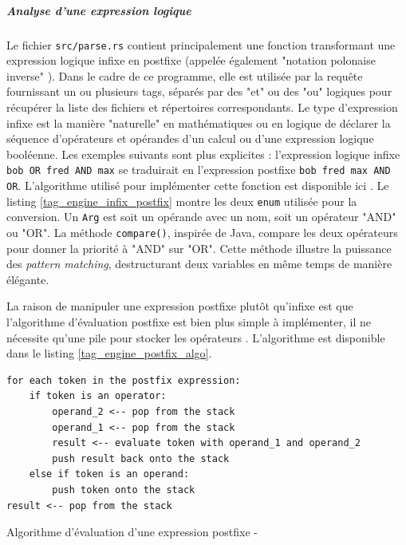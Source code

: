 \subparagraph{Analyse d'une expression logique}\label{tag_engine_parse}
Le fichier \texttt{src/parse.rs} contient principalement une fonction transformant 
une expression logique infixe en postfixe (appelée également "notation polonaise inverse" \cite{ref41}). 
Dans le cadre de ce programme, elle est utilisée par la requête fournissant un ou plusieurs tags, 
séparés par des "et" ou des "ou" logiques pour récupérer la liste des fichiers et répertoires 
correspondants. Le type d'expression infixe est la manière "naturelle" en mathématiques ou en 
logique de déclarer la séquence d'opérateurs et opérandes d'un calcul ou d'une expression logique 
booléenne. Les exemples suivants sont plus explicites : l'expression logique infixe 
\texttt{bob OR fred AND max} se traduirait en l'expression postfixe 
\texttt{bob fred max AND OR}. L'algorithme utilisé pour implémenter cette fonction 
est disponible ici \cite{ref40}. Le listing \ref{tag_engine_infix_postfix} montre 
les deux \texttt{enum} utilisée pour la conversion. Un \texttt{Arg} est soit 
un opérande avec un nom, soit un opérateur "AND" ou "OR". La méthode \texttt{compare()}, 
inspirée de Java, compare les deux opérateurs pour donner la priorité à "AND" sur "OR". Cette 
méthode illustre la puissance des \textit{pattern matching}, destructurant deux variables en 
même temps de manière élégante.
\bigbreak
{}
\bigbreak
La raison de manipuler une expression postfixe 
plutôt qu'infixe est que l'algorithme d'évaluation postfixe est bien plus simple à implémenter, il 
ne nécessite qu'une pile pour stocker les opérateurs \cite{ref41}. L'algorithme est disponible dans 
le listing \ref{tag_engine_postfix_algo}.
\bigbreak
\begin{code}
    \begin{verbatim}
for each token in the postfix expression:
    if token is an operator:
        operand_2 <-- pop from the stack
        operand_1 <-- pop from the stack
        result <-- evaluate token with operand_1 and operand_2
        push result back onto the stack
    else if token is an operand:
        push token onto the stack
result <-- pop from the stack
    \end{verbatim}
    \caption{Algorithme d'évaluation d'une expression postfixe - \cite{ref41}}
    \label{tag_engine_postfix_algo}
\end{code}
